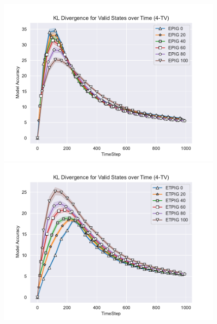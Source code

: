 \documentclass[12pt]{thesis}
\begin{document}
\begin{figure}[p]
	
	\includegraphics[scale=0.5]{"images/Epsilon_Model_Accuracy_EPIG_4-TV.pdf"}
	\includegraphics[scale=0.5]{"images/Epsilon_Model_Accuracy_ETPIG_4-TV.pdf"}
	

\end{figure}
\end{document}
